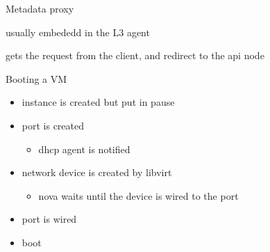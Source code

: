 \documentclass[english,serif,mathserif,xcolor=pdftex,dvipsnames,table]{beamer}
\begin{document}
\begin{frame}
  {Metadata proxy}

  usually embededd in the L3 agent

  gets the request from the client, and redirect to the api node

\end{frame}

\begin{frame}
  {Booting a VM}

  \begin{itemize}
  \item instance is created but put in pause
  \item port is created
    \begin{itemize}
    \item dhcp agent is notified
    \end{itemize}
  \item network device is created by libvirt
    \begin{itemize}
    \item nova waits until the device is wired to the port
    \end{itemize}
  \item port is wired
  \item boot 
  \end{itemize}
\end{frame}
\end{document}
